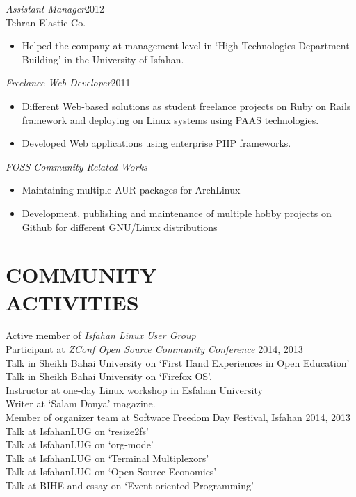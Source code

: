 \documentclass[margin, 10pt]{res} %
\begin{document}
\begin{resume}
{\sl Assistant Manager}\hfill 2012 \\
Tehran Elastic Co.
\begin{itemize}
\item Helped the company at management level in `High Technologies Department
  Building' in the University of Isfahan.
\end{itemize} 

{\sl Freelance Web Developer}\hfill 2011 \\
\begin{itemize}
\item Different Web-based solutions as student freelance projects on Ruby on Rails
  framework and deploying on Linux systems using PAAS technologies.
\item Developed Web applications using enterprise PHP frameworks.
\end{itemize} 

{\sl FOSS Community Related Works}\hfil \\
\begin{itemize}
\item Maintaining multiple AUR packages for ArchLinux
\item Development, publishing and maintenance of multiple hobby projects on Github for
  different GNU/Linux distributions
\end{itemize} 


\section{COMMUNITY \\ ACTIVITIES}

Active member of {\it Isfahan Linux User Group} \\
Participant at {\it ZConf Open Source Community Conference} 2014, 2013 \\
Talk in Sheikh Bahai University on `First Hand Experiences in Open Education' \\
Talk in Sheikh Bahai University on `Firefox OS'. \\
Instructor at one-day Linux workshop in Esfahan University \\
Writer at `Salam Donya' magazine. \\
Member of organizer team at Software Freedom Day Festival, Isfahan 2014, 2013 \\
Talk at IsfahanLUG on `resize2fs' \\
Talk at IsfahanLUG on `org-mode' \\
Talk at IsfahanLUG on `Terminal Multiplexors' \\
Talk at IsfahanLUG on `Open Source Economics' \\
Talk at BIHE and essay on `Event-oriented Programming'


\end{resume}
\end{document}
